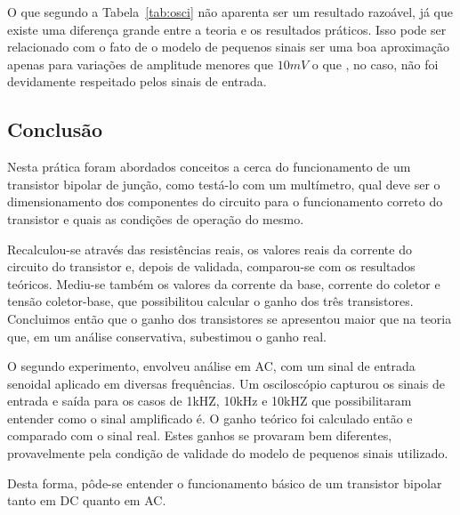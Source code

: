 \documentclass[12pt,a4paper]{article}
\begin{document}
O que segundo a Tabela~\ref{tab:osci} não aparenta ser um resultado razoável, já que 
existe uma diferença grande entre a teoria e os resultados práticos. Isso pode ser 
relacionado com o fato de o modelo de pequenos sinais ser uma boa aproximação apenas 
para variações de amplitude menores que $10mV$ o que , no caso, não foi devidamente respeitado
pelos sinais de entrada.
\newpage
\subsection{Conclusão}
Nesta prática foram abordados conceitos a cerca do funcionamento de um transistor bipolar de junção, 
como testá-lo com um multímetro, qual deve ser o dimensionamento dos componentes do circuito para 
o funcionamento correto do transistor e quais as condições de operação do mesmo.

Recalculou-se através das resistências reais, os valores reais da corrente do circuito do transistor e,
depois de validada, comparou-se com os resultados teóricos. Mediu-se também os valores
da corrente da base, corrente do coletor e tensão coletor-base, que possibilitou
calcular o ganho dos três transistores. Concluimos então que o 
ganho dos transistores se apresentou maior que na teoria que, em um análise conservativa, 
subestimou o ganho real.

O segundo experimento, envolveu análise em AC, com um sinal de entrada senoidal aplicado 
em diversas frequências. Um osciloscópio capturou os sinais de entrada e saída para os casos
de 1kHZ, 10kHz e 10kHZ que possibilitaram entender como o sinal amplificado é. O ganho 
teórico foi calculado então e comparado com o sinal real. Estes ganhos se provaram bem 
diferentes, provavelmente pela condição de validade do modelo de pequenos sinais utilizado.

Desta forma, pôde-se entender o funcionamento básico de um transistor bipolar tanto em DC 
quanto em AC.
\end{document}
